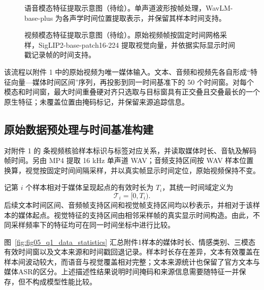 \begin{figure}[!htbp]
    \centering
    \caption{语音模态特征提取示意图（待绘）。单声道波形按帧处理，WavLM-base-plus 为各声学时间位置提取表示，并保留其样本时间支持。}
    \label{fig:fig03_q1_audio_feature_extraction}
\end{figure}

\begin{figure}[!htbp]
    \centering
    \caption{视频模态特征提取示意图（待绘）。原始视频帧按固定时间网格采样，SigLIP2-base-patch16-224 提取视觉向量，并依据实际显示时间戳记录帧的时间支持。}
    \label{fig:fig04_q1_video_feature_extraction}
\end{figure}

该流程以附件 1 中的原始视频为唯一媒体输入。文本、音频和视频先各自形成“特征向量—媒体时间区间”序列，再投影到同一时间基准下的 50 个时间窗。对每个模态和时间窗，最大时间重叠硬对齐只选取与目标窗具有正交叠且交叠最长的一个原生特征；未覆盖位置由掩码标记，并保留来源追踪信息。

\subsection{原始数据预处理与时间基准构建}\label{subsec:q1_timeline}
对附件 1 的 \QOneSamples 条视频核验样本标识与标签对应关系，并读取媒体时长、音轨及解码帧时间。另由 MP4 提取 16 kHz 单声道 WAV；音频支持区间按 WAV 样本位置换算，视觉按固定时间间隔采样，并以真实帧显示时间定位，原始视频保持不变。

记第 $i$ 个样本相对于媒体呈现起点的有效时长为 $T_i$，其统一时间域定义为
\begin{equation}
\mathcal{T}_i=[0,T_i).
\label{eq:q1_timeline}
\end{equation}
后续文本时间区间、音频帧支持区间和视觉帧支持区间均以秒表示，并相对于该样本的媒体起点。视觉特征的支持区间由相邻采样帧的真实显示时间构造。由此，不同采样频率下的特征均可在同一时间坐标中进行比较。

图~\ref{fig:fig05_q1_data_statistics} 汇总附件1样本的媒体时长、情感类别、三模态有效时间窗以及文本来源和时间戳回退记录。样本时长存在差异，文本有效覆盖在样本间波动较大，而语音与视觉覆盖相对完整；文本来源统计也保留了官方文本与媒体ASR的区分。上述描述性结果说明时间掩码和来源信息需要随特征一并保存，但不构成模型性能比较。

